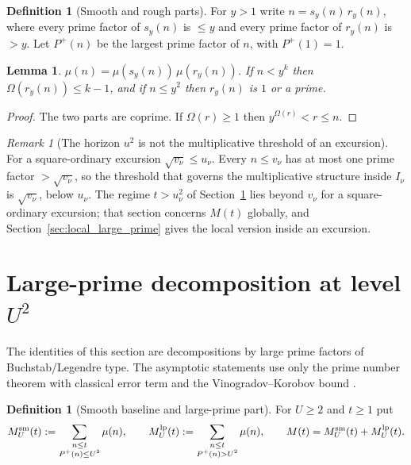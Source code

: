 \documentclass[11pt]{amsart}
\numberwithin{equation}{section}
\theoremstyle{plain}
\newtheorem{lemma}[theorem]{Lemma}
\theoremstyle{definition}
\newtheorem{definition}[theorem]{Definition}
\theoremstyle{remark}
\newtheorem{remark}[theorem]{Remark}
\newcommand{\Pp}{P^{+}}
\begin{document}
\begin{definition}[Smooth and rough parts]
\label{def:smooth_rough}
For $y>1$ write $n=s_y(n)\,r_y(n)$, where every prime factor of $s_y(n)$
is $\le y$ and every prime factor of $r_y(n)$ is $>y$. Let $\Pp(n)$ be the
largest prime factor of $n$, with $\Pp(1)=1$.
\end{definition}

\begin{lemma}
\label{lem:rough_part}
$\mu(n)=\mu(s_y(n))\,\mu(r_y(n))$. If $n<y^k$ then $\Omega(r_y(n))\le k-1$,
and if $n\le y^2$ then $r_y(n)$ is $1$ or a prime.
\end{lemma}

\begin{proof}
The two parts are coprime. If $\Omega(r)\ge1$ then $y^{\Omega(r)}<r\le n$.
\end{proof}

\begin{remark}[The horizon $u^2$ is not the multiplicative threshold of an excursion]
\label{rem:horizon_inactive}
For a square-ordinary excursion $\sqrt{v_\nu}\le u_\nu$. Every $n\le v_\nu$
has at most one prime factor $>\sqrt{v_\nu}$, so the threshold that governs
the multiplicative structure inside $I_\nu$ is $\sqrt{v_\nu}$, below
$u_\nu$. The regime $t>u_\nu^2$ of Section~\ref{sec:prime_copy_propagation}
lies beyond $v_\nu$ for a square-ordinary excursion; that section concerns
$M(t)$ globally, and Section~\ref{sec:local_large_prime} gives the local
version inside an excursion.
\end{remark}

\section{Large-prime decomposition at level \texorpdfstring{$U^2$}{U squared}}
\label{sec:prime_copy_propagation}

The identities of this section are decompositions by large prime factors of
Buchstab/Legendre type. The asymptotic statements use only the prime number
theorem with classical error term and the Vinogradov--Korobov bound
\cite{MontgomeryVaughan2007,Walfisz1963}.

\begin{definition}[Smooth baseline and large-prime part]
\label{def:baseline_channel}
For $U\ge2$ and $t\ge1$ put
\begin{equation}
\label{eq:baseline_channel_def}
  M^{\rm sm}_U(t):=\sum_{\substack{n\le t\\ \Pp(n)\le U^2}}\mu(n),\qquad
  M^{\rm lp}_U(t):=\sum_{\substack{n\le t\\ \Pp(n)>U^2}}\mu(n),\qquad
  M(t)=M^{\rm sm}_U(t)+M^{\rm lp}_U(t).
\end{equation}
\end{definition}
\end{document}
